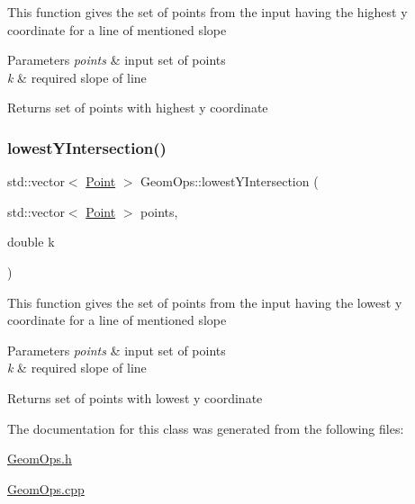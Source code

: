This function gives the set of points from the input having the highest y coordinate for a line of mentioned slope 
\begin{DoxyParams}{Parameters}
{\em points} & input set of points \\
\hline
{\em k} & required slope of line \\
\hline
\end{DoxyParams}
\begin{DoxyReturn}{Returns}
set of points with highest y coordinate 
\end{DoxyReturn}
\mbox{\label{classGeomOps_a4dc89814b38593ac562c5d9cef3739df}} 
\subsubsection{\texorpdfstring{lowest\+Y\+Intersection()}{lowestYIntersection()}}
{\footnotesize\ttfamily std\+::vector$<$ \hyperlink{classPoint}{Point} $>$ Geom\+Ops\+::lowest\+Y\+Intersection (\begin{DoxyParamCaption}\item[{std\+::vector$<$ \hyperlink{classPoint}{Point} $>$}]{points,  }\item[{double}]{k }\end{DoxyParamCaption})}

This function gives the set of points from the input having the lowest y coordinate for a line of mentioned slope 
\begin{DoxyParams}{Parameters}
{\em points} & input set of points \\
\hline
{\em k} & required slope of line \\
\hline
\end{DoxyParams}
\begin{DoxyReturn}{Returns}
set of points with lowest y coordinate 
\end{DoxyReturn}


The documentation for this class was generated from the following files\+:\begin{DoxyCompactItemize}
\item 
\hyperlink{GeomOps_8h}{Geom\+Ops.\+h}\item 
\hyperlink{GeomOps_8cpp}{Geom\+Ops.\+cpp}\end{DoxyCompactItemize}
